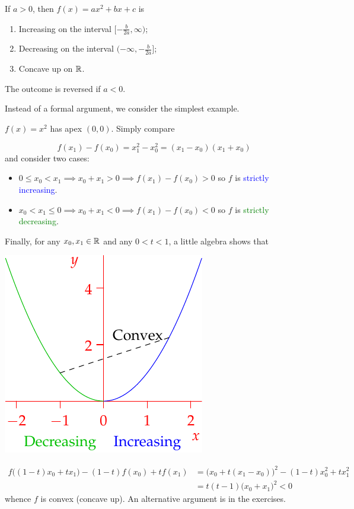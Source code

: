 \begin{thm}{}{}
If $a>0$, then $f(x)=ax^2+bx+c$ is
\begin{enumerate}
  \item Increasing on the interval $[-\frac b{2a},\infty)$;
  \item Decreasing on the interval $(-\infty,-\frac b{2a}]$;
  \item Concave up on $\mathbb{R}$.
\end{enumerate}
The outcome is reversed if $a<0$.
\end{thm}

Instead of a formal argument, 
we consider the simplest example.

\begin{example}{}{}
$f(x)=x^2$ has apex $(0,0)$. Simply compare\par
\begin{minipage}[t]{0.65\linewidth}\vspace{0pt}
\[f(x_1)-f(x_0)=x_1^2-x_0^2 =(x_1-x_0)(x_1+x_0)\]
and consider two cases:
\begin{itemize}
  \item $0\le x_0<x_1\implies x_0+x_1>0\implies f(x_1)-f(x_0)>0$ so $f$ is \textcolor{blue}{strictly increasing}.
  \item $x_0<x_1\le 0\implies x_0+x_1<0\implies f(x_1)-f(x_0)<0$ so $f$ is \textcolor{Green}{strictly decreasing}.
\end{itemize}
Finally, for any $x_0,x_1\in\mathbb{R}$ and any $0<t<1$, a little algebra shows that
\end{minipage}\begin{minipage}[t]{0.35\linewidth}\vspace{-10pt}
\flushright\includegraphics{poly-quad3}
\end{minipage}

\begin{align*}
f\bigl((1-t)x_0+tx_1\bigr)-(1-t)f(x_0)+tf(x_1)&=\bigl(x_0+t(x_1-x_0)\bigr)^2-(1-t)x_0^2+tx_1^2\\
&=t(t-1)\bigl(x_0+x_1\bigr)^2<0
\end{align*}
whence $f$ is convex (concave up). An alternative argument is in the exercises.
\end{example}



\begin{exercises}{}{}
\end{exercises}
\fi